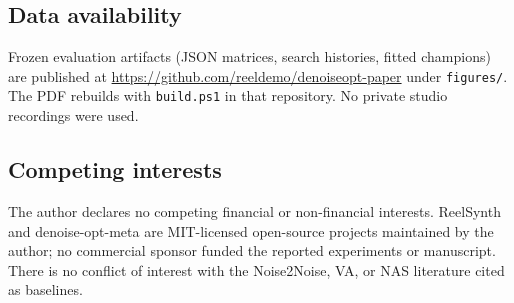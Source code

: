 \subsection{Data availability}
\label{sec:data-availability}
Frozen evaluation artifacts (JSON matrices, search histories, fitted champions)
are published at \url{https://github.com/reeldemo/denoiseopt-paper}
under \texttt{figures/}.
The PDF rebuilds with \texttt{build.ps1} in that repository.
No private studio recordings were used.

\subsection{Competing interests}
\label{sec:competing}
The author declares no competing financial or non-financial interests.
ReelSynth and denoise-opt-meta are MIT-licensed open-source projects maintained by the author; no commercial sponsor funded the reported experiments or manuscript.
There is no conflict of interest with the Noise2Noise, VA, or NAS literature cited as baselines.
